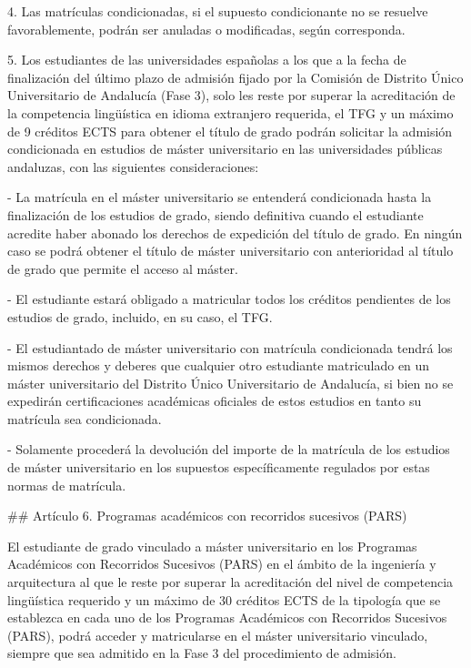 \documentclass{article}
\begin{document}
\begin{itemize}
\begin{itemize}
\begin{scriptsize}
                  4. Las matrículas condicionadas, si el supuesto condicionante no se resuelve favorablemente, podrán ser anuladas o modificadas, según corresponda.

                  5. Los estudiantes de las universidades españolas a los que a la fecha de finalización del último plazo de admisión fijado por la Comisión de Distrito Único Universitario de Andalucía (Fase 3), solo les reste por superar la acreditación de la competencia lingüística en idioma extranjero requerida, el TFG y un máximo de 9 créditos ECTS para obtener el título de grado podrán solicitar la admisión condicionada en estudios de máster universitario en las universidades públicas andaluzas, con las siguientes consideraciones:

                  - La matrícula en el máster universitario se entenderá condicionada hasta la finalización de los estudios de grado, siendo definitiva cuando el estudiante acredite haber abonado los derechos de expedición del título de grado. En ningún caso se podrá obtener el título de máster universitario con anterioridad al título de grado que permite el acceso al máster.

                  - El estudiante estará obligado a matricular todos los créditos pendientes de los estudios de grado, incluido, en su caso, el TFG.

                  - El estudiantado de máster universitario con matrícula condicionada tendrá los mismos derechos y deberes que cualquier otro estudiante matriculado en un máster universitario del Distrito Único Universitario de Andalucía, si bien no se expedirán certificaciones académicas oficiales de estos estudios en tanto su matrícula sea condicionada.

                  - Solamente procederá la devolución del importe de la matrícula de los estudios de máster universitario en los supuestos específicamente regulados por estas normas de matrícula.

                  \#\# Artículo 6. Programas académicos con recorridos sucesivos (PARS)

                  El estudiante de grado vinculado a máster universitario en los Programas Académicos con Recorridos Sucesivos (PARS) en el ámbito de la ingeniería y arquitectura al que le reste por superar la acreditación del nivel de competencia lingüística requerido y un máximo de 30 créditos ECTS de la tipología que se establezca en cada uno de los Programas Académicos con Recorridos Sucesivos (PARS), podrá acceder y matricularse en el máster universitario vinculado, siempre que sea admitido en la Fase 3 del procedimiento de admisión.


\end{scriptsize}
\end{itemize}
\end{itemize}
\end{document}
